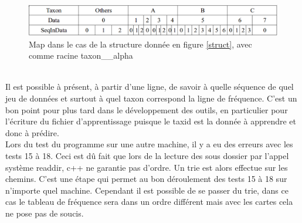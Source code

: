 \begin{figure}[H]
\begin{center}
\includegraphics[scale=0.34]{./../img/map.png}
\caption{\label{map} Map dans le cas de la structure donnée en figure \ref{struct}, avec comme racine taxon\_\_alpha}
\end{center}
\end{figure}
~\\

Il est possible à présent,  à partir d'une ligne, de savoir à quelle séquence de quel jeu de données et surtout à quel taxon correspond la ligne de fréquence. C'est un bon point pour plus tard dans le développement des outils, en particulier pour l'écriture du fichier d’apprentissage puisque le taxid est la donnée à apprendre et donc à prédire. 
\\


Lors du test du programme sur une autre machine, il y a eu des erreurs avec les tests 15 à 18. Ceci est dû fait que lors de la lecture des sous dossier par l'appel système readdir, c++ ne garantie pas d'ordre. Un trie est alors effectue sur les chemins. C'est une étape qui permet au bon déroulement des tests 15 à 18 sur n'importe quel machine. Cependant il est possible de se passer du trie, dans ce cas le tableau de fréquence sera dans un ordre différent mais avec les cartes cela ne pose pas de soucis. 
